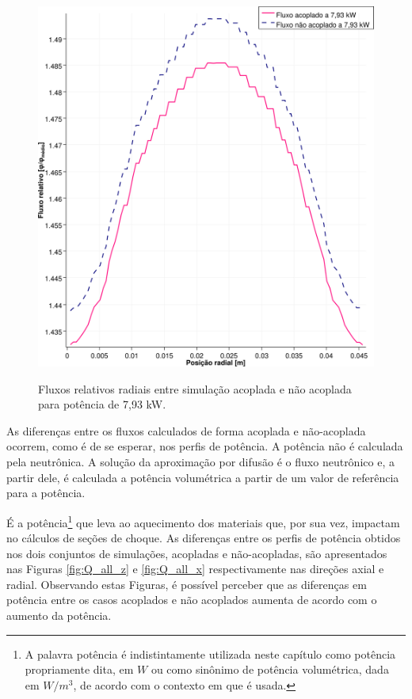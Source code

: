 \begin{figure}[htb]
  \caption{Fluxos relativos radiais entre simulação acoplada e não acoplada para
    potência de 7,93 kW.}
  \centering\includegraphics[scale=0.5]{figuras/Flux_rel_x_200_port.png}
  \label{fig:flux_x_200}
\end{figure}

As diferenças entre os fluxos calculados de forma acoplada e não-acoplada ocorrem,
como é de se esperar, nos perfis de potência. A potência não é calculada pela
neutrônica. A solução da aproximação por difusão é o fluxo neutrônico e, a partir
dele, é calculada a potência volumétrica a partir de um valor de referência para
a potência.

É a potência\footnote{A palavra potência é indistintamente utilizada neste capítulo como potência
  propriamente dita, em $W$ ou como sinônimo de potência volumétrica, dada em $W/m^3$, de acordo
com o contexto em que é usada.} que leva ao aquecimento dos materiais que, por sua vez, impactam
no cálculos de seções de choque. As diferenças entre os perfis de potência obtidos nos dois conjuntos
de simulações, acopladas e não-acopladas, são apresentados nas Figuras \ref{fig:Q_all_z} e
\ref{fig:Q_all_x} respectivamente nas direções axial e radial. Observando estas Figuras,
é possível perceber que as diferenças em potência entre os casos acoplados e
não acoplados aumenta de acordo com o aumento da potência.

